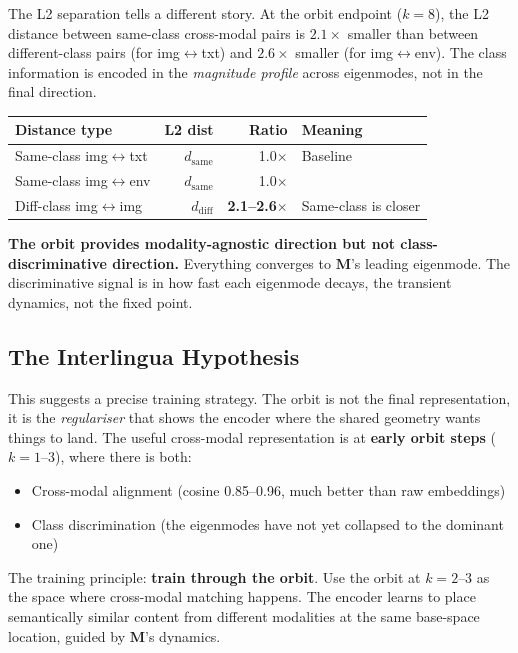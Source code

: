 \documentclass[11pt, a4paper]{article}
\newcommand{\M}{\mathbf{M}}
\theoremstyle{plain}
\theoremstyle{remark}
\begin{document}
The L2 separation tells a different story.
At the orbit endpoint ($k{=}8$), the L2 distance between same-class cross-modal pairs is $2.1\times$ smaller than between different-class pairs (for img$\leftrightarrow$txt) and $2.6\times$ smaller (for img$\leftrightarrow$env).
The class information is encoded in the \emph{magnitude profile} across eigenmodes, not in the final direction.

\begin{center}\small
\begin{tabular}{@{}lrrl@{}}
\toprule
\textbf{Distance type} & \textbf{L2 dist} & \textbf{Ratio} & \textbf{Meaning} \\
\midrule
Same-class img$\leftrightarrow$txt & $d_{\text{same}}$ & 1.0$\times$ & Baseline \\
Same-class img$\leftrightarrow$env & $d_{\text{same}}$ & 1.0$\times$ & \\
Diff-class img$\leftrightarrow$img & $d_{\text{diff}}$ & \textbf{2.1--2.6$\times$} & Same-class is closer \\
\bottomrule
\end{tabular}
\end{center}

\textbf{The orbit provides modality-agnostic direction but not class-discriminative direction.}
Everything converges to $\M$'s leading eigenmode.
The discriminative signal is in how fast each eigenmode decays, the transient dynamics, not the fixed point.

\subsection{The Interlingua Hypothesis}

This suggests a precise training strategy.
The orbit is not the final representation, it is the \emph{regulariser} that shows the encoder where the shared geometry wants things to land.
The useful cross-modal representation is at \textbf{early orbit steps} ($k{=}1$--3), where there is both:
\begin{itemize}[nosep]
    \item Cross-modal alignment (cosine 0.85--0.96, much better than raw embeddings)
    \item Class discrimination (the eigenmodes have not yet collapsed to the dominant one)
\end{itemize}

The training principle: \textbf{train through the orbit}.
Use the orbit at $k{=}2$--3 as the space where cross-modal matching happens.
The encoder learns to place semantically similar content from different modalities at the same base-space location, guided by $\M$'s dynamics.
\end{document}
